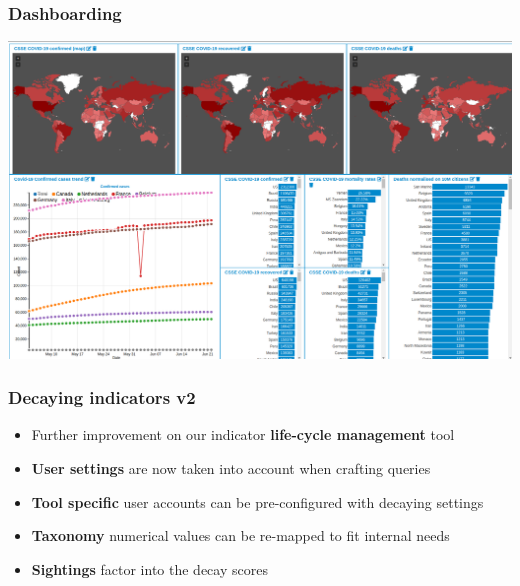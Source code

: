 \begin{frame}
\frametitle{Dashboarding}
\includegraphics[scale=0.25]{images/dashboard.png}
\end{frame}


\begin{frame}
\frametitle{Decaying indicators v2}
\begin{itemize}
        \item Further improvement on our indicator {\bf life-cycle management} tool
	\item {\bf User settings} are now taken into account when crafting queries
        \item {\bf Tool specific} user accounts can be pre-configured with decaying settings
        \item {\bf Taxonomy} numerical values can be re-mapped to fit internal needs
        \item {\bf Sightings} factor into the decay scores
\end{itemize}
\end{frame}

